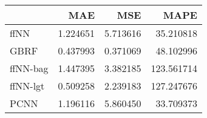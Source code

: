 \begin{tabular}{lrrr}
\toprule
{} &       MAE &       MSE &        MAPE \\
\midrule
ffNN     &  1.224651 &  5.713616 &   35.210818 \\
GBRF     &  0.437993 &  0.371069 &   48.102996 \\
ffNN-bag &  1.447395 &  3.382185 &  123.561714 \\
ffNN-lgt &  0.509258 &  2.239183 &  127.247676 \\
PCNN     &  1.196116 &  5.860450 &   33.709373 \\
\bottomrule
\end{tabular}
